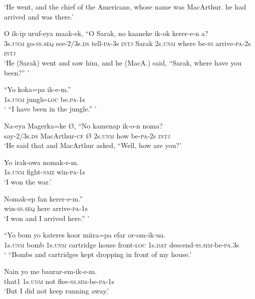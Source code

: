 \glt ‘He went, and the chief of the Americans, whose name was MacArthur. he had arrived and was there.’ \\
\z


\ea
\gll  O  ik-ip  uruf-eya  maak-ek,  ``O  Sarak,  no    kaaneke  ik-ok  kerer-e-n  a? \\
3s.\textsc{unm}  go-\textsc{ss.seq}  see-2/3s.\textsc{ds}  tell-\textsc{pa}-3s  \textsc{intj}  Sarak  2s.\textsc{unm}     where  be-\textsc{ss}  arrive-\textsc{pa}-2s  \textsc{intj} \\


\glt ‘He (Sarak) went and saw him, and he (MacA.) said, “Sarak, where have you been?” ’ \\
\z


\ea
\gll  “Yo  koka=pa  ik-e-m.” \\
1s.\textsc{unm}  jungle-\textsc{loc}  be.\textsc{pa}-1s \\
\glt ‘ “I have been in the jungle.” ’ \\
\z


\ea
\gll  Na-eya  Magerka=ke  Ø,  ``No  kamenap  ik-o-n  noma? \\
say-2/3s.\textsc{ds}  MacArthur-\textsc{cf}  Ø  2s.\textsc{unm}  how  be-\textsc{pa}-2s  \textsc{intj} \\
\glt ‘He said that and MacArthur asked, “Well, how are you?’ \\
\z


\ea
\gll  Yo  irak-owa  nomak-e-m. \\
1s.\textsc{unm}  fight-\textsc{nmz}  win-\textsc{pa}-1s \\
\glt ‘I won the war.’ \\
\z


\ea
\gll  Nomak-ep  fan  kerer-e-m.” \\
win-\textsc{ss.seq}  here  arrive-\textsc{pa}-1s \\
\glt ‘I won and I arrived here.” ’ \\
\z


\ea
\gll  “Yo  bom  yo  kateres  koor  miira=pa  efar           or-om-ik-ua. \\
1s.\textsc{unm}  bomb  1s.\textsc{unm}  cartridge  house  front-\textsc{loc}  1s.\textsc{dat}   descend-\textsc{ss}.\textsc{sim}-be-\textsc{pa}.3s \\


\glt ‘ “Bombs and cartridges kept dropping in front of my house.’ \\
\z


\ea
\gll  Nain  yo  me  baurar-em-ik-e-m. \\
that1  1s.\textsc{unm}  not  flee-\textsc{ss}.\textsc{sim}-be-\textsc{pa}-1s \\
\glt ‘But I did not keep running away.’ \\
\z


